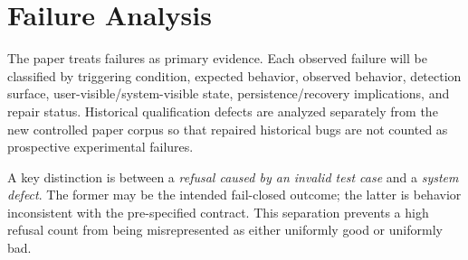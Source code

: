 \section{Failure Analysis}

The paper treats failures as primary evidence. Each observed failure will be classified by triggering condition, expected behavior, observed behavior, detection surface, user-visible/system-visible state, persistence/recovery implications, and repair status. Historical qualification defects are analyzed separately from the new controlled paper corpus so that repaired historical bugs are not counted as prospective experimental failures.

A key distinction is between a \emph{refusal caused by an invalid test case} and a \emph{system defect}. The former may be the intended fail-closed outcome; the latter is behavior inconsistent with the pre-specified contract. This separation prevents a high refusal count from being misrepresented as either uniformly good or uniformly bad.
